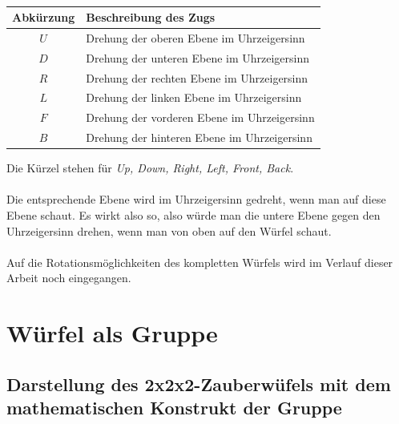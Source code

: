 \documentclass[12pt,a4paper, usenames, dvipsnames]{article}
\begin{document}
\begin{table}[H]
\centering
\begin{tabular}{|c|l|}
\hline
Abkürzung & Beschreibung des Zugs \\
\hline
\hline
$U$ & Drehung der oberen Ebene im Uhrzeigersinn \\
\hline
$D$ & Drehung der unteren Ebene im Uhrzeigersinn \\
\hline
$R$ & Drehung der rechten Ebene im Uhrzeigersinn \\
\hline
$L$ & Drehung der linken Ebene im Uhrzeigersinn \\%
\hline
$F$ & Drehung der vorderen Ebene im Uhrzeigersinn \\
\hline
$B$ & Drehung der hinteren Ebene im Uhrzeigersinn \\
\hline
\end{tabular} 
\caption[Ebenenrotationen]{}
\end{table}

Die Kürzel stehen für \textit{Up, Down, Right, Left, Front, Back}.  \\
\\
Die entsprechende Ebene wird im Uhrzeigersinn gedreht, wenn man auf diese Ebene schaut. Es wirkt also so, also würde man die untere Ebene gegen den Uhrzeigersinn drehen, wenn man von oben auf den Würfel schaut.  \\
\\
Auf die Rotationsmöglichkeiten des kompletten Würfels wird im Verlauf dieser Arbeit noch eingegangen.
\newpage



















\section{Würfel als Gruppe}

\subsection*{Darstellung des 2x2x2-Zauberwüfels mit dem mathematischen Konstrukt der Gruppe} 
\end{document}
